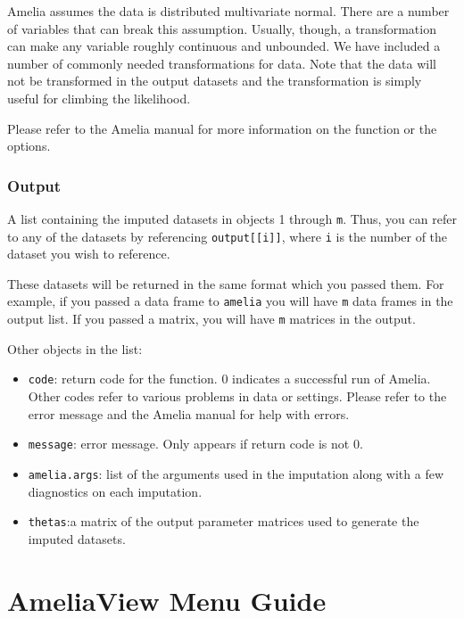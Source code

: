 \documentclass[12pt,titlepage]{article}
\begin{document}
  Amelia assumes the data is distributed multivariate normal.  There are a 
  number of variables that can break this assumption.  Usually, though, a 
  transformation can make any variable roughly continuous and unbounded.
  We have included a number of commonly needed transformations for data.
  Note that the data will not be transformed in the output datasets and the
  transformation is simply useful for climbing the likelihood.
  
  Please refer to the Amelia manual for more information on the function
  or the options.

\subsubsection*{Output}
A list containing the imputed datasets in objects 1 through \texttt{m}.
  Thus, you can refer to any of the datasets by referencing 
  \texttt{output[[i]]}, where \texttt{i} is the number of the dataset you wish
  to reference.
  
  These datasets will be returned in the same format which you passed them.
  For example, if you passed a data frame to \texttt{amelia} you will have
  \texttt{m} data frames in the output list.  If you passed a matrix, you 
  will have \texttt{m} matrices in the output.  
  
  Other objects in the list:
\begin{itemize}
  \item \texttt{code}: return code for the function.  0 indicates a successful run
    of Amelia.  Other codes refer to various problems in data or settings.
    Please refer to the error message and the Amelia manual for help with
    errors.
  
  \item \texttt{message}: error message.  Only appears if return code is not 0.

  \item \texttt{amelia.args}: list of the arguments used in the imputation along
    with a few diagnostics on each imputation.
  \item \texttt{thetas}:a matrix of the output parameter matrices used to
    generate the imputed datasets.
\end{itemize}

\section{AmeliaView Menu Guide}
\label{sec:menu}
\end{document}
